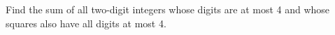 Find the sum of all two-digit integers whose digits are at most 4 and whose squares also have all digits at most 4.
